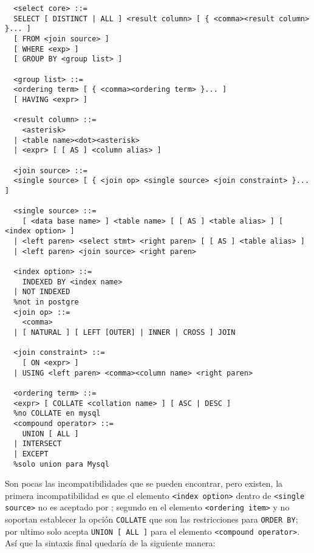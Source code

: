 \begin{Verbatim}
  <select core> ::=
  SELECT [ DISTINCT | ALL ] <result column> [ { <comma><result column> }... ] 
  [ FROM <join source> ]
  [ WHERE <exp> ]
  [ GROUP BY <group list> ]
  
  <group list> ::=
  <ordering term> [ { <comma><ordering term> }... ]
  [ HAVING <expr> ]
  
  <result column> ::=
    <asterisk>
  | <table name><dot><asterisk>
  | <expr> [ [ AS ] <column alias> ]
  
  <join source> ::=
  <single source> [ { <join op> <single source> <join constraint> }... ]
  
  <single source> ::=
    [ <data base name> ] <table name> [ [ AS ] <table alias> ] [ <index option> ]
  | <left paren> <select stmt> <right paren> [ [ AS ] <table alias> ]
  | <left paren> <join source> <right paren>
  
  <index option> ::=
    INDEXED BY <index name> 
  | NOT INDEXED
  %not in postgre
  <join op> ::=
    <comma>
  | [ NATURAL ] [ LEFT [OUTER] | INNER | CROSS ] JOIN
  
  <join constraint> ::=
    [ ON <expr> ]
  | USING <left paren> <comma><column name> <right paren>
  
  <ordering term> ::=
  <expr> [ COLLATE <collation name> ] [ ASC | DESC ]
  %no COLLATE en mysql
  <compound operator> ::=
    UNION [ ALL ]
  | INTERSECT 
  | EXCEPT
  %solo union para Mysql
\end{Verbatim}
Son pocas las incompatibilidades que se pueden encontrar, pero existen, la primera incompatibilidad es que el elemento \verb=<index option>= dentro de \verb=<single source>= no es aceptado por \p; segundo en el elemento \verb=<ordering item>= \m y \p no soportan establecer la opción \verb=COLLATE= que son las restricciones para \verb=ORDER BY=; por ultimo \m solo acepta \verb=UNION [ ALL ]= para el elemento \verb=<compound operator>=. Así que la sintaxis final quedaría de la siguiente manera:  

